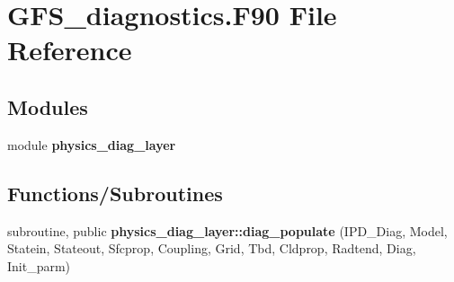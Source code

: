 \section{G\+F\+S\+\_\+diagnostics.\+F90 File Reference}
\label{_g_f_s__diagnostics_8_f90}
\subsection*{Modules}
\begin{DoxyCompactItemize}
\item 
module \textbf{ physics\+\_\+diag\+\_\+layer}
\end{DoxyCompactItemize}
\subsection*{Functions/\+Subroutines}
\begin{DoxyCompactItemize}
\item 
subroutine, public \textbf{ physics\+\_\+diag\+\_\+layer\+::diag\+\_\+populate} (I\+P\+D\+\_\+\+Diag, Model, Statein, Stateout, Sfcprop, Coupling, Grid, Tbd, Cldprop, Radtend, Diag, Init\+\_\+parm)
\end{DoxyCompactItemize}
